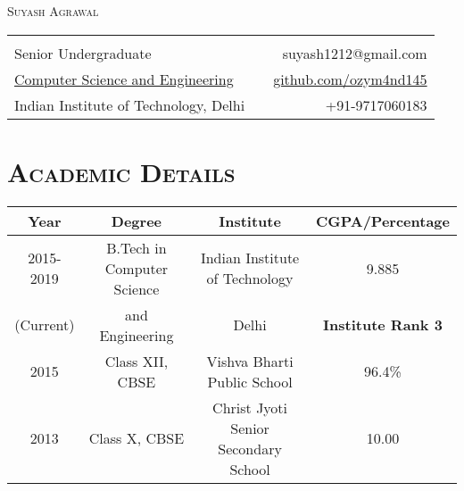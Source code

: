 \documentclass{article}
\newcommand{\tmpsection}[1]{}
\let\tmpsection=\section
\renewcommand{\section}[1]{\tmpsection*{\textsc{#1}}}
\begin{document}

\begin{center}
 {\Large \textsc{Suyash Agrawal} }\\ 
\begin{tabular}{ l p{8cm} r }
    & &   \\
    Senior Undergraduate & & suyash1212@gmail.com \\
   \href{http://www.cse.iitd.ernet.in/}{Computer Science and Engineering} & & \href{https://github.com/ozym4nd145/}{github.com/ozym4nd145} \\
   Indian Institute of Technology, Delhi& & +91-9717060183 \\
\end{tabular}
\end{center}


\section{Academic Details}

\begin{center}
\begin{tabular}{ |c | c | c | c |}
\hline
Year & Degree & Institute & CGPA/Percentage \\ 
\hline
2015-2019 & B.Tech in Computer Science & Indian Institute of Technology & 9.885 \\ 
(Current) & and Engineering & Delhi & \textbf{Institute Rank 3}\\
\hline


2015 & Class XII, CBSE & Vishva Bharti Public School & 96.4\% \\ 

\hline
2013 & Class X, CBSE & Christ Jyoti Senior Secondary School & 10.00 \\  \hline
\end{tabular}
\end{center}
\end{document}
